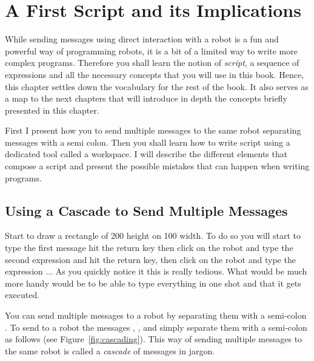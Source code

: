 
\ifx\wholebook\relax\else



\fi

\chapter{A First Script and its Implications}\label{cha:firstscript}

While sending messages using direct interaction with a robot is a fun and powerful way of programming robots, it is a bit of a limited way to write more complex programs. Therefore you shall learn the notion of \emph{script}, \ie a sequence of expressions and all the necessary concepts that you will use in this book. Hence, this chapter settles down the vocabulary for the rest of the book. It also serves as a map to the next chapters that will introduce in depth the concepts briefly presented in this chapter.
 
First I present how you to send multiple messages to the same robot separating messages with a semi colon. Then you shall learn how to write script using a dedicated tool called a  workspace. I will describe the different elements that compose a script and  present the possible mistakes that can happen when writing programs.
 
\section{Using a Cascade to Send Multiple Messages}
Start to draw a rectangle of 200 height on 100 width. To do so you will start to type the first message  hit the return key then click on the robot and type the second expression  and hit the return key, then click on the robot and type the expression ... As you quickly notice it this is really tedious. What would be much more handy would be to be able to type everything in one shot and that it gets executed. 

You can send multiple messages to a robot by separating them with  a semi-colon \ct{;}.  To send to a robot  the messages , , and   simply separate them with a semi-colon \ct{;} as follows  (see Figure~\ref{fig:cascading}). This way of sending multiple messages to the same robot is called a \emph{cascade} of messages in \sq jargon. 

